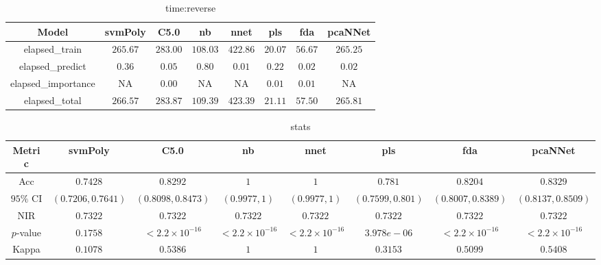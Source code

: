 \begin{table}[!ht]
	\centering
	\begin{tabular}{|c|c|c|c|c|c|c|c|}
		\hline
		Model & svmPoly & C5.0 & nb & nnet & pls & fda & pcaNNet \\ \hline
		elapsed_train & $265.67$ & $283.00$ & $108.03$ & $422.86$ & $20.07$ & $56.67$ & $265.25$ \\ \hline
		elapsed_predict & $0.36$ & $0.05$ & $0.80$ & $0.01$ & $0.22$ & $0.02$ & $0.02$ \\ \hline
		elapsed_importance & NA & $0.00$ & NA & NA & $0.01$ & $0.01$ & NA \\ \hline
		elapsed_total & $266.57$ & $283.87$ & $109.39$ & $423.39$ & $21.11$ & $57.50$ & $265.81$ \\ \hline
	\end{tabular}
	\caption{time:reverse}
	\label{tab:time:reverse}
\end{table}

\begin{table}[!ht]
	\centering
	\begin{tabular}{|c|c|c|c|c|c|c|c|}
		\hline
		Metric & svmPoly & C5.0 & nb & nnet & pls & fda & pcaNNet \\ \hline
		Acc & $0.7428$ & $0.8292$ & $1$ & $1$ & $0.781$ & $0.8204$ & $0.8329$ \\ \hline
		$95\%$ CI & $(0.7206, 0.7641)$ & $(0.8098, 0.8473)$ & $(0.9977, 1)$ & $(0.9977, 1)$ & $(0.7599, 0.801)$ & $(0.8007, 0.8389)$ & $(0.8137, 0.8509)$ \\ \hline
		NIR & $0.7322$ & $0.7322$ & $0.7322$ & $0.7322$ & $0.7322$ & $0.7322$ & $0.7322$ \\ \hline
		$p$-value & $0.1758$ & $< 2.2 \times {10}^{-16}$ & $< 2.2 \times {10}^{-16}$ & $< 2.2 \times {10}^{-16}$ & $3.978e-06$ & $< 2.2 \times {10}^{-16}$ & $< 2.2 \times {10}^{-16}$ \\ \hline
		Kappa & $0.1078$ & $0.5386$ & $1$ & $1$ & $0.3153$ & $0.5099$ & $0.5408$ \\ \hline
	\end{tabular}
	\caption{stats}
	\label{tab:stats}
\end{table}

